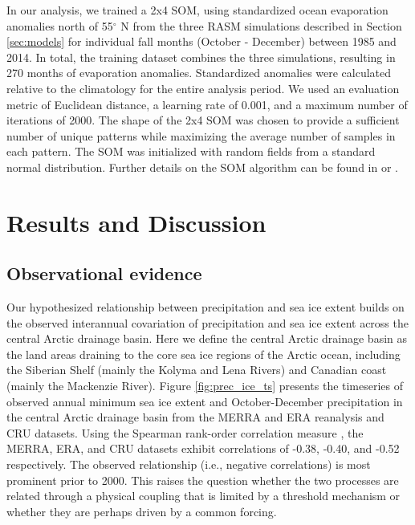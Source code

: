 In our analysis, we trained a 2x4 SOM, using standardized ocean evaporation anomalies north of 55$^{\circ}$ N from the three RASM simulations described in Section \ref{sec:models} for individual fall months (October - December) between 1985 and 2014.
In total, the training dataset combines the three simulations, resulting in 270 months of evaporation anomalies.
Standardized anomalies were calculated relative to the climatology for the entire analysis period.
We used an evaluation metric of Euclidean distance, a learning rate of 0.001, and a maximum number of iterations of 2000.
The shape of the 2x4 SOM was chosen to provide a sufficient number of unique patterns while maximizing the average number of samples in each pattern.
The SOM was initialized with random fields from a standard normal distribution. %
Further details on the SOM algorithm can be found in \citet{Reusch_2005} or \citet{Cassano_2015}.

\section{Results and Discussion}
\label{sec:results_ch5}
\subsection{Observational evidence}
Our hypothesized relationship between precipitation and sea ice extent builds on the observed interannual covariation of precipitation and sea ice extent across the central Arctic drainage basin.
Here we define the central Arctic drainage basin as the land areas draining to the core sea ice regions of the Arctic ocean, including the Siberian Shelf (mainly the Kolyma and Lena Rivers) and Canadian coast (mainly the Mackenzie River).
Figure \ref{fig:prec_ice_ts} presents the timeseries of observed annual minimum sea ice extent and October-December precipitation in the central Arctic drainage basin from the MERRA and ERA reanalysis and CRU datasets.
Using the Spearman rank-order correlation measure \citep{Spearman_1904}, the MERRA, ERA, and CRU datasets exhibit correlations of -0.38, -0.40, and -0.52 respectively.
The observed relationship (i.e., negative correlations) is most prominent prior to 2000.
This raises the question whether the two processes are related through a physical coupling that is limited by a threshold mechanism or whether they are perhaps driven by a common forcing.

